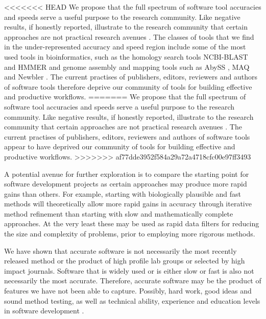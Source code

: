 \documentclass[fleqn,10pt]{SelfArx} %
\begin{document}
<<<<<<< HEAD
We propose that the full spectrum of software tool accuracies and speeds serve a useful purpose to the research community. Like negative results, if honestly reported, illustrate to the research community that certain approaches are not practical research avenues \cite{Ioannidis2005-xh,Workman1999-au,Rivas2000-fb}. The classes of tools that we find in the under-represented accuracy and speed region include some of the most used tools in bioinformatics, such as the homology search tools NCBI-BLAST \cite{Altschul1990-ht,Altschul1997-ga} and HMMER \cite{Eddy:2009} and genome assembly and mapping tools such as AbySS \cite{Simpson:2009}, MAQ \cite{Li:2008} and Newbler \cite{Margulies:2005}. The current practises of publishers, editors, reviewers and authors of software tools therefore deprive our community of tools for building effective and productive workflows.
=======
We propose that the full spectrum of software tool accuracies and speeds serve a useful purpose to the research community. Like negative results, if honestly reported, illustrate to the research community that certain approaches are not practical research avenues \cite{Ioannidis2005-xh,Workman1999-au,Rivas2000-fb}. The current practises of publishers, editors, reviewers and authors of software tools appear to have  deprived our community of tools for building effective and productive workflows.
>>>>>>> af77dde3952f584a29a72a4718cfc00e97ff3493

A potential avenue for further exploration is to compare the starting point for software development projects as certain approaches may produce more rapid gains than others. For example, starting with biologically plausible and fast methods will theoretically allow more rapid gains in accuracy through iterative method refinement than starting with slow and mathematically complete approaches. At the very least these may be used as rapid data filters for reducing the size and complexity of problems, prior to employing more rigorous methods. 


We have shown that accurate software is not necessarily the most recently released method or the product of high profile lab groups or selected by high impact journals. Software that is widely used or is either slow or fast is also not necessarily the most accurate. Therefore, accurate software may be the product of features we have not been able to capture. Possibly, hard work, good ideas and sound method testing, as well as technical ability, experience and education levels in software development \cite{Wilson2006-ih}. 
\end{document}

